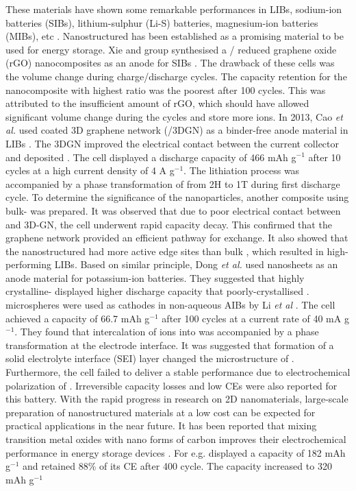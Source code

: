 These materials have shown some remarkable performances in LIBs, sodium-ion batteries (SIBs), lithium-sulphur (Li-S) batteries, magnesium-ion batteries (MIBs), etc \cite{xie_mos2/graphene_2015,cao_preparation_2013,dong_insights_2019,li_rechargeable_2018}. Nanostructured  has been established as a promising material to be used for energy storage. Xie and group synthesised a / reduced graphene oxide (rGO) nanocomposites as an anode for SIBs \cite{xie_mos2/graphene_2015}. The drawback of these cells was the volume change during charge/discharge cycles. The capacity retention for the nanocomposite with highest  ratio was the poorest after 100 cycles. This was attributed to the insufficient amount of rGO, which should have allowed significant volume change during the cycles and store more  ions. In 2013, Cao \textit{et al.} used  coated 3D graphene network (/3DGN) as a binder-free anode material in LIBs \cite{cao_preparation_2013}. The 3DGN improved the electrical contact between the current collector and deposited . The cell displayed a discharge capacity of 466 mAh g$^{-1}$ after 10 cycles at a  high current density of 4 A g$^{-1}$. The lithiation process was accompanied by a phase transformation of  from 2H to 1T during first discharge cycle. To determine the significance of the  nanoparticles, another composite using bulk- was prepared. It was observed that due to poor electrical contact between  and 3D-GN, the cell underwent rapid capacity decay. This confirmed that the graphene network provided an efficient pathway for  exchange. It also showed that the nanostructured  had more active edge sites than bulk , which resulted in high-performing LIBs. Based on similar principle, Dong \textit{et al.} used  nanosheets as an anode material for potassium-ion batteries. They suggested that highly crystalline- displayed higher discharge capacity that poorly-crystallised  \cite{dong_insights_2019}.  microspheres were used as cathodes in non-aqueous AIBs by Li \textit{et al} \cite{li_rechargeable_2018}. The cell achieved a capacity of 66.7 mAh g$^{-1}$ after 100 cycles at a current rate of 40 mA g$^{-1}$. They found that intercalation of  ions into  was accompanied by a phase transformation at the electrode interface. It was suggested that formation of a solid electrolyte interface (SEI) layer changed the microstructure of . Furthermore, the cell failed to deliver a stable performance due to electrochemical polarization of . Irreversible capacity losses and low CEs were also reported for this battery. With the rapid progress in research on 2D nanomaterials, large-scale preparation of nanostructured materials at a low cost can be expected for practical applications in the near future. It has been reported that mixing transition metal oxides with nano forms of carbon improves their electrochemical performance in energy storage devices \cite{acerce_metallic_2015-1,zhao_flexible_2015,hu_hierarchical_2015,cao_preparation_2013,ding_facile_2012}. For e.g.  displayed a capacity of 182 mAh g$^{-1}$ and retained 88\% of its CE after 400 cycle. The capacity increased to 320 mAh g$^{-1}$ 